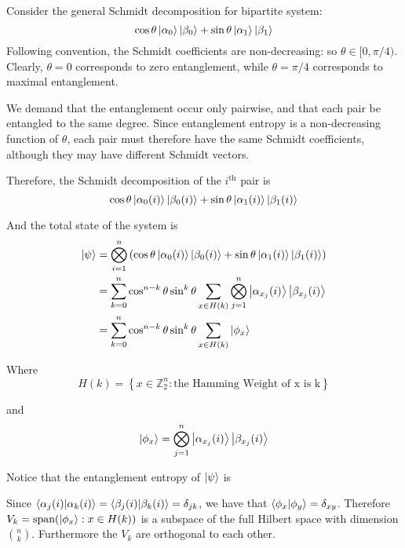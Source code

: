 \newcommand{\ZZ}{\mathbb{Z}} %
\newcommand{\vspan}{\text{span}} %



Consider the general Schmidt decomposition for bipartite system:
$$
\cos\theta \ket{\alpha_0} \ket{\beta_0} + 
\sin\theta \ket{\alpha_1} \ket{\beta_1}
$$
Following convention, the Schmidt coefficients are non-decreasing: so $\theta \in [0, \pi/4)$. Clearly, $\theta = 0$ corresponds to zero entanglement, while $\theta = \pi/4$ corresponds to maximal entanglement.


We demand that the entanglement occur only pairwise, and that each pair be entangled to the same degree. Since entanglement entropy is a non-decreasing function of $\theta$, each pair must therefore have the same Schmidt coefficients, although they may have different Schmidt vectors. 

Therefore, the Schmidt decomposition of the $i^{\text{th}}$ pair is  
$$
\cos\theta \ket{\alpha_0(i)} \ket{\beta_0(i)} + 
\sin\theta \ket{\alpha_1(i)} \ket{\beta_1(i)}
$$

And the total state of the system is
\begin{align}
	\ket{\psi} &= \bigotimes_{i=1}^n \left( 
	\cos\theta \ket{\alpha_0(i)} \ket{\beta_0(i)} + 
	\sin\theta \ket{\alpha_1(i)} \ket{\beta_1(i)} \right) \\
	&= \sum_{k=0}^n \cos^{n-k}\theta \sin^k\theta
	\sum_{x \in H(k)} \bigotimes_{j=1}^n 
	\ket{\alpha_{x_j}(i)} \ket{\beta_{x_j}(i)} \\
	&=  \sum_{k=0}^n \cos^{n-k}\theta \sin^k\theta
	\sum_{x \in H(k)} \ket{\phi_x}
\end{align}

Where 
$$
H(k) = \left\{ 
	x \in \ZZ_2^n : \text{the Hamming Weight of x is k} \right\}
$$

and
$$
\ket{\phi_x} = \bigotimes_{j=1}^n 
\ket{\alpha_{x_j}(i)} \ket{\beta_{x_j}(i)}
$$

Notice that the entanglement entropy of $\ket{\psi}$ is

Since $ \braket{\alpha_j(i)}{\alpha_k(i)} = \braket{\beta_j(i)}{\beta_k(i)} = \delta_{jk} $, we have that $\braket{\phi_x}{\phi_y} = \delta_{xy}$.
Therefore $V_k = \vspan(\ket{\phi_x} : x \in H(k))$ is a subspace of the full Hilbert space with dimension $\binom{n}{k}$.
Furthermore the $V_k$ are orthogonal to each other.


